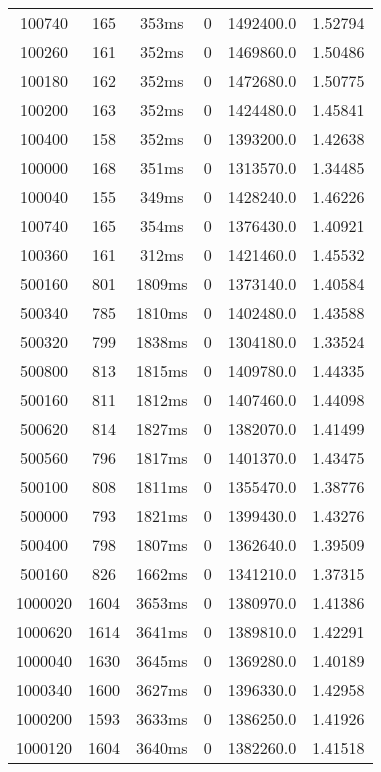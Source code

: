 \documentclass[./main.tex]{subfiles}
\begin{document}
\begin{table}
\begin{tabular}{ c | c | c | c | c | c }
        100740 & 165 & 353ms & 0 & 1492400.0 & 1.52794 \\
        100260 & 161 & 352ms & 0 & 1469860.0 & 1.50486 \\
        100180 & 162 & 352ms & 0 & 1472680.0 & 1.50775 \\
        \rowcolor{lightgray} 100200 & 163 & 352ms & 0 & 1424480.0 & 1.45841 \\
        100400 & 158 & 352ms & 0 & 1393200.0 & 1.42638 \\
        100000 & 168 & 351ms & 0 & 1313570.0 & 1.34485 \\
        100040 & 155 & 349ms & 0 & 1428240.0 & 1.46226 \\
        100740 & 165 & 354ms & 0 & 1376430.0 & 1.40921 \\
        100360 & 161 & 312ms & 0 & 1421460.0 & 1.45532 \\
        \hline
        500160 & 801 & 1809ms & 0 & 1373140.0 & 1.40584 \\
        500340 & 785 & 1810ms & 0 & 1402480.0 & 1.43588 \\
        500320 & 799 & 1838ms & 0 & 1304180.0 & 1.33524 \\
        500800 & 813 & 1815ms & 0 & 1409780.0 & 1.44335 \\
        500160 & 811 & 1812ms & 0 & 1407460.0 & 1.44098 \\
        \rowcolor{lightgray} 500620 & 814 & 1827ms & 0 & 1382070.0 & 1.41499 \\
        500560 & 796 & 1817ms & 0 & 1401370.0 & 1.43475 \\
        500100 & 808 & 1811ms & 0 & 1355470.0 & 1.38776 \\
        500000 & 793 & 1821ms & 0 & 1399430.0 & 1.43276 \\
        500400 & 798 & 1807ms & 0 & 1362640.0 & 1.39509 \\
        500160 & 826 & 1662ms & 0 & 1341210.0 & 1.37315 \\
        \hline
        \rowcolor{lightgray} 1000020 & 1604 & 3653ms & 0 & 1380970.0 & 1.41386 \\
        1000620 & 1614 & 3641ms & 0 & 1389810.0 & 1.42291 \\
        1000040 & 1630 & 3645ms & 0 & 1369280.0 & 1.40189 \\
        1000340 & 1600 & 3627ms & 0 & 1396330.0 & 1.42958 \\
        1000200 & 1593 & 3633ms & 0 & 1386250.0 & 1.41926 \\
        1000120 & 1604 & 3640ms & 0 & 1382260.0 & 1.41518 \\

\end{tabular}
\end{table}
\end{document}
